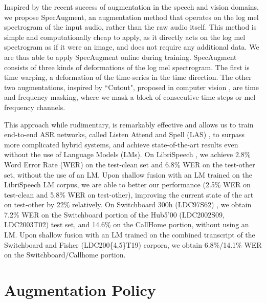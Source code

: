\documentclass[a4paper]{article}
\begin{document}
Inspired by the recent success of augmentation in the speech and vision domains, we propose SpecAugment, an augmentation method that operates on the log mel spectrogram of the input audio, rather than the raw audio itself. This method is simple and computationally cheap to apply, as it directly acts on the log mel spectrogram as if it were an image, and does not require any additional data. We are thus able to apply SpecAugment online during training. SpecAugment consists of three kinds of deformations of the log mel spectrogram. The first is time warping, a deformation of the time-series in the time direction. The other two augmentations, inspired by ``Cutout", proposed in computer vision \cite{devries-arxiv-2017}, are time and frequency masking, where we mask a block of consecutive time steps or mel frequency channels.

This approach while rudimentary, is remarkably effective and allows us to train end-to-end ASR networks, called Listen Attend and Spell (LAS) \cite{Chan2016ListenAA}, to surpass more complicated hybrid systems, and achieve state-of-the-art results even without the use of Language Models (LMs). 
On LibriSpeech \cite{Panayotov2015LibriSpeechAA}, we achieve 2.8\% Word Error Rate (WER) on the test-clean set and 6.8\% WER on the test-other set, without the use of an LM. Upon shallow fusion \cite{gulcehre-2015-arxiv} with an LM trained on the LibriSpeech LM corpus, we are able to better our performance (2.5\% WER on test-clean and 5.8\% WER on test-other), improving the current state of the art on test-other by 22\% relatively. On Switchboard 300h (LDC97S62) \cite{switchboard}, we obtain 7.2\% WER on the Switchboard portion of the Hub5'00 (LDC2002S09, LDC2003T02) test set, and 14.6\% on the CallHome portion, without using an LM. Upon shallow fusion with an LM trained on the combined transcript of the Switchboard and Fisher (LDC200\{4,5\}T19) \cite{fisher} corpora, we obtain 6.8\%/14.1\% WER on the Switchboard/Callhome portion.


\section{Augmentation Policy}
\end{document}
